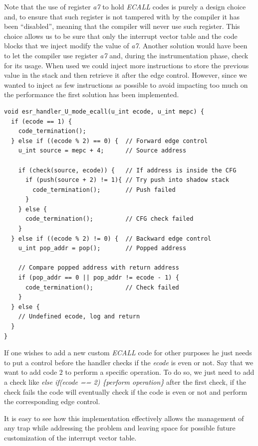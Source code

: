 Note that the use of register \textit{a7} to hold \textit{ECALL} codes is purely
a design choice and, to ensure that such register is not tampered with by the compiler
it has been ``disabled'', meaning that the compiler will never use such register.
This choice allows us to be sure that only the interrupt vector table and the code
blocks that we inject modify the value of \textit{a7}. Another solution would have
been to let the compiler use register \textit{a7} and, during the instrumentation
phase, check for its usage. When used we could inject more instructions to store
the previous value in the stack and then retrieve it after the edge control.
However, since we wanted to inject as few instructions as possible to avoid impacting
too much on the performance the first solution has been implemented. \\
\begin{lstlisting}[style=CStyle, caption = U-mode \textit{ECALL} handler, label={lst:ecallhandler}]
void esr_handler_U_mode_ecall(u_int ecode, u_int mepc) {
  if (ecode == 1) {
    code_termination();
  } else if ((ecode % 2) == 0) {  // Forward edge control
    u_int source = mepc + 4;      // Source address

    if (check(source, ecode)) {   // If address is inside the CFG
      if (push(source + 2) != 1){ // Try push into shadow stack
        code_termination();       // Push failed
      }
    } else {
      code_termination();         // CFG check failed
    }
  } else if ((ecode % 2) != 0) {  // Backward edge control
    u_int pop_addr = pop();       // Popped address

    // Compare popped address with return address
    if (pop_addr == 0 || pop_addr != ecode - 1) {
      code_termination();         // Check failed
    }
  } else {
    // Undefined ecode, log and return
  }
}
\end{lstlisting}

If one wishes to add a new custom \textit{ECALL} code for other purposes he just
needs to put a control before the handler checks if the \textit{ecode} is even or
not. Say that we want to add code $2$ to perform a specific operation. To do so,
we just need to add a check like \textit{else if(ecode == 2) \{perform operation\}}
after the first check, if the check fails the code will eventually check if the
code is even or not and perform the corresponding edge control.

It is easy to see how this implementation effectively allows the management of
any trap while addressing the problem and leaving space for possible future
customization of the interrupt vector table.

